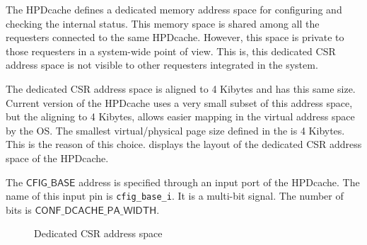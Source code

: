 \documentclass[10pt,titlepage,twoside]{book}
\begin{document}
The \ac{HPDcache} defines a dedicated memory address space for configuring and checking the internal status.
This memory space is shared among all the requesters connected to the same \ac{HPDcache}.
However, this space is private to those requesters in a system-wide point of view.
This is, this dedicated \ac{CSR} address space is not visible to other requesters integrated in the system.

The dedicated \ac{CSR} address space is aligned to 4 Kibytes and has this same size.
Current version of the \ac{HPDcache} uses a very small subset of this address space, but the aligning to 4 Kibytes, allows easier mapping in the virtual address space by the \ac{OS}.
The smallest virtual/physical page size defined in the \cite{RISCV_privileged_spec} is 4 Kibytes.
This is the reason of this choice.
 displays the layout of the dedicated \ac{CSR} address space of the \ac{HPDcache}.

The $\mathsf{CFIG\_BASE}$ address is specified through an input port of the \ac{HPDcache}.
The name of this input pin is \lstinline{cfig_base_i}.
It is a multi-bit signal.
The number of bits is $\mathsf{CONF\_DCACHE\_PA\_WIDTH}$.

\begin{figure}[!htbp]
\begin{center}
  \caption{Dedicated CSR address space}%
\end{center}
\end{figure}
\end{document}
